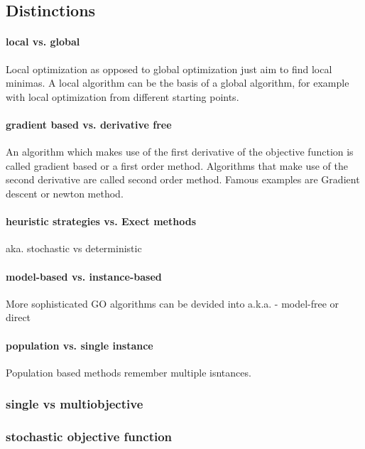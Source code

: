 \documentclass[english]{article}
\begin{document}
\subsection{Distinctions}


\paragraph{local vs. global} Local optimization as opposed to global optimization just aim to find local minimas. A local algorithm can be the basis of a global algorithm, for example with local optimization from different starting points.

\paragraph{gradient based vs. derivative free}
An algorithm which makes use of the first derivative of the objective function is called gradient based or a first order method. Algorithms that make use of the second derivative are called second order method. Famous examples are Gradient descent or newton method.

\paragraph{heuristic strategies vs. Exect methods}
aka. stochastic vs deterministic

\paragraph{model-based vs. instance-based}
More sophisticated \ac{GO} algorithms can be devided into
a.k.a. - model-free or direct

\paragraph{population vs. single instance}
Population based methods remember multiple isntances.

\subsubsection*{single vs multiobjective}


\subsubsection*{stochastic objective function}
\end{document}
